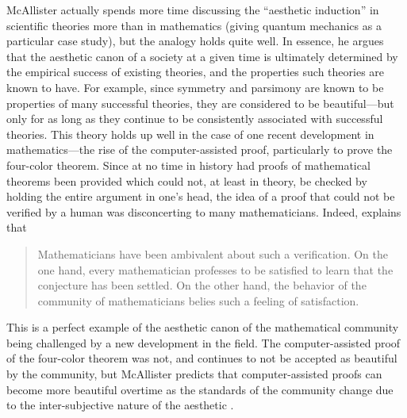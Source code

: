\documentclass[a4paper,man,natbib]{apa6}
\begin{document}
McAllister actually spends more time discussing the ``aesthetic induction'' in scientific theories more than
in mathematics (giving quantum mechanics as a particular case study), but the analogy holds quite well. In 
essence, he argues that the aesthetic canon of a society
at a given time is ultimately determined by the empirical success of existing theories, and the properties such
theories are known to have. For example, since symmetry and parsimony are known to be properties of many 
successful theories, they are considered to be beautiful---but only for as long as they continue to be consistently 
associated with successful theories. This theory holds up well in the case of one recent development in 
mathematics---the rise of the computer-assisted proof, particularly to prove the four-color theorem. Since at no
time in history had proofs of mathematical theorems been provided which could not, at least in theory, be checked 
by holding the entire argument in one's head, the idea of a proof that could not be verified by a human was
disconcerting to many mathematicians. Indeed, \cite{rota_phenomenology_1997} explains that
\begin{quotation}
      Mathematicians have been ambivalent about such a verification. On the one hand, every mathematician 
      professes to be satisfied to learn that the conjecture has been settled. On the other hand, the 
      behavior of the community of mathematicians belies such a feeling of satisfaction.
\end{quotation}
This is a perfect example of the aesthetic canon of the mathematical community being challenged by a new
development in the field. The computer-assisted proof of the four-color theorem was not, and continues to not be 
accepted as beautiful by the community, but McAllister predicts that computer-assisted proofs can become more 
beautiful overtime as the standards of the community change due to the inter-subjective nature of the 
aesthetic \citep{mcallister_mathematical_2005}.
\end{document}
